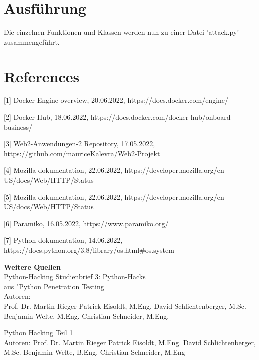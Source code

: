 \documentclass[12pt]{article}
\begin{document}
\section{Ausführung}
Die einzelnen Funktionen und Klassen werden nun zu einer Datei 'attack.py' zusammengeführt.

\newpage
\section{References}
[1] Docker Engine overview, 20.06.2022, https://docs.docker.com/engine/

\vspace{4mm}


[2] Docker Hub, 18.06.2022, https://docs.docker.com/docker-hub/onboard-business/
\vspace{4mm}

[3] Web2-Anwendungen-2 Repository, 17.05.2022, https://github.com/mauriceKalevra/Web2-Projekt

\vspace{4mm}

[4] Mozilla dokumentation, 22.06.2022, https://developer.mozilla.org/en-US/docs/Web/HTTP/Status

\vspace{4mm}

[5] Mozilla dokumentation, 22.06.2022, https://developer.mozilla.org/en-US/docs/Web/HTTP/Status

\vspace{4mm}

[6] Paramiko, 16.05.2022, https://www.paramiko.org/

\vspace{4mm}

[7] Python dokumentation, 14.06.2022, https://docs.python.org/3.8/library/os.html\#os.system

\vspace{4mm}

\textbf{Weitere Quellen}\\
Python-Hacking
Studienbrief 3: Python-Hacks\\
aus "Python Penetration Testing\\
Autoren:\\
Prof. Dr. Martin Rieger
Patrick Eisoldt, M.Eng.
David Schlichtenberger, M.Sc.
Benjamin Welte, M.Eng.
Christian Schneider, M.Eng.
\vspace{4mm}

Python Hacking
Teil 1\\
Autoren:
Prof. Dr. Martin Rieger
Patrick Eisoldt, M.Eng.
David Schlichtenberger, M.Sc.
Benjamin Welte, B.Eng.
Christian Schneider, M.Eng
\end{document}
